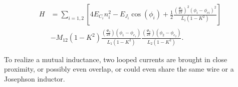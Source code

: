 \documentclass[svgnames]{article}     %
\begin{document}
\begin{align} \label{}
  H &= \sum_{i=1,2}^{} \left[ 4E_{C_i} n_i^2 - E_{J_i} \cos (\phi_i)
    + \frac{1}{2} \frac{\left( \frac{\Phi_0}{2\pi} \right) ^2 (\phi_i
  -\phi_{ei} )^2 }{L_i (1 - K^2)} \right] \nonumber \\ 
    &- M_{12} (1 - K^2) \frac{\left( \frac{\Phi_0}{2\pi} \right) (\phi_1
    - \phi_{e_1}) }{L_1 (1 - K^2)} \frac{\left( \frac{\Phi_0}{2\pi} \right)
  (\phi_2 - \phi_{e_2})}{L_2(1-K^2)}. 
\end{align}\vspace{3px}

To realize a mutual inductance, two looped currents are brought in close
proximity, or possibly even overlap, or could even share the same wire or
a Josephson inductor. 
\end{document}
